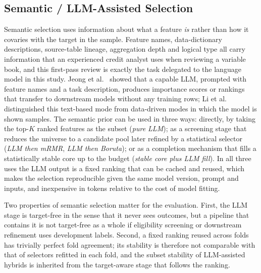 \documentclass[preprint,12pt]{elsarticle}
\newcommand{\Kfeat}{K}
\begin{document}
\subsection{Semantic / LLM-Assisted Selection}
\label{subsec:llm_fs_background}

Semantic selection uses information about what a feature \emph{is} rather than how it covaries with the target in the sample. Feature names, data-dictionary descriptions, source-table lineage, aggregation depth and logical type all carry information that an experienced credit analyst uses when reviewing a variable book, and this first-pass review is exactly the task delegated to the language model in this study. Jeong et al.\ \cite{jeong2025} showed that a capable LLM, prompted with feature names and a task description, produces importance scores or rankings that transfer to downstream models without any training rows; Li et al.\ \cite{li2025sigkdd} distinguished this text-based mode from data-driven modes in which the model is shown samples. The semantic prior can be used in three ways: directly, by taking the top-$\Kfeat$ ranked features as the subset (\emph{pure LLM}); as a screening stage that reduces the universe to a candidate pool later refined by a statistical selector (\emph{LLM then mRMR}, \emph{LLM then Boruta}); or as a completion mechanism that fills a statistically stable core up to the budget (\emph{stable core plus LLM fill}). In all three uses the LLM output is a fixed ranking that can be cached and reused, which makes the selection reproducible given the same model version, prompt and inputs, and inexpensive in tokens relative to the cost of model fitting.

Two properties of semantic selection matter for the evaluation. First, the LLM stage is target-free in the sense that it never sees outcomes, but a pipeline that contains it is not target-free as a whole if eligibility screening or downstream refinement uses development labels. Second, a fixed ranking reused across folds has trivially perfect fold agreement; its stability is therefore not comparable with that of selectors refitted in each fold, and the subset stability of LLM-assisted hybrids is inherited from the target-aware stage that follows the ranking.
\end{document}
